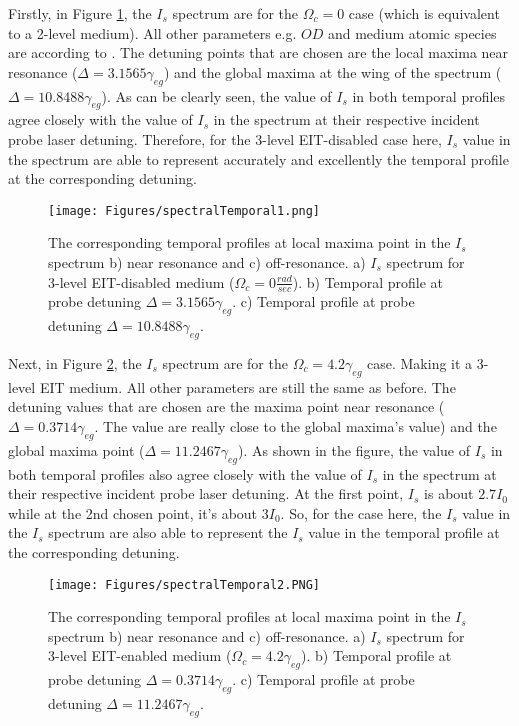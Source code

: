Firstly, in Figure \ref{fig: corresponding temporal profile 1}, the $I_{s}$ spectrum are for the $\Omega_{c} = 0$ case (which is equivalent to a 2-level medium). All other parameters e.g. $OD$ and medium atomic species are according to . The detuning points that are chosen are the local maxima near resonance ($\Delta = 3.1565\gamma_{eg}$) and the global maxima at the wing of the spectrum ($\Delta = 10.8488\gamma_{eg}$). As can be clearly seen, the value of $I_{s}$ in both temporal profiles agree closely with the value of $I_{s}$ in the spectrum at their respective incident probe laser detuning. Therefore, for the 3-level EIT-disabled case here, $I_{s}$ value in the spectrum are able to represent accurately and excellently the temporal profile at the corresponding detuning.

\begin{figure}
    \centering
    \texttt{[image: Figures/spectralTemporal1.png]}
    \caption[Plots of Transmitted Intensity Temporal Profile At Their Corresponding Detuning in The $I_{s}$ Spectrum For $\Omega_{c} = 0$]{The corresponding temporal profiles at local maxima point in the $I_{s}$ spectrum b) near resonance and c) off-resonance. a) $I_{s}$ spectrum for 3-level EIT-disabled medium ($\Omega_{c} = 0 \frac{rad}{sec}$). b)  Temporal profile at probe detuning $\Delta = 3.1565\gamma_{eg}$. c) Temporal profile at probe detuning $\Delta = 10.8488\gamma_{eg}$.}
    \label{fig: corresponding temporal profile 1}
\end{figure}

Next, in Figure \ref{fig: corresponding temporal profile 2}, the $I_{s}$ spectrum are for the $\Omega_{c} = 4.2\gamma_{eg}$ case. Making it a 3-level EIT medium. All other parameters are still the same as before. The detuning values that are chosen are the maxima point near resonance ($\Delta = 0.3714\gamma_{eg}$. The value are really close to the global maxima's value) and the global maxima point ($\Delta = 11.2467\gamma_{eg}$). As shown in the figure, the value of $I_{s}$ in both temporal profiles also agree closely with the value of $I_{s}$ in the spectrum at their respective incident probe laser detuning. At the first point, $I_{s}$ is about $2.7I_{0}$ while at the 2nd chosen point, it's about $3I_{0}$. So, for the case here, the $I_{s}$ value in the $I_{s}$ spectrum are also able to represent the $I_{s}$ value in the temporal profile at the corresponding detuning.

\begin{figure}
    \centering
     \texttt{[image: Figures/spectralTemporal2.PNG]}
    \caption[Plots of Transmitted Intensity Temporal Profile At Their Corresponding Detuning in The $I_{s}$ Spectrum For $\Omega_{c} = 4.2\gamma_{eg}$]{The corresponding temporal profiles at local maxima point in the $I_{s}$ spectrum b) near resonance and c) off-resonance. a) $I_{s}$ spectrum for 3-level EIT-enabled medium ($\Omega_{c} = 4.2\gamma_{eg}$). b) Temporal profile at probe detuning $\Delta = 0.3714\gamma_{eg}$. c) Temporal profile at probe detuning $\Delta = 11.2467\gamma_{eg}$.}
    \label{fig: corresponding temporal profile 2}
\end{figure}

